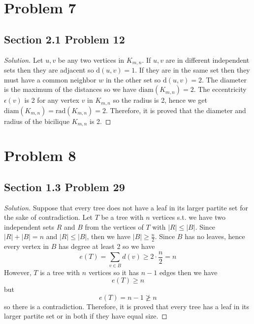 \documentclass[12pt]{article}
\newenvironment*{solution}{\begin{proof}[Solution]}{\end{proof}}
\begin{document}
\section*{Problem 7}
\subsection*{Section 2.1 Problem 12}
\begin{solution}
    Let \(u,v\) be any two vertices in \(K_{m,n}\). If \(u,v\) are in
    different independent sets then they are adjacent so \(\text{d}(u,v)=1\).
    If they are in the same set then they must have a common neighbor \(w\) in
    the other set so \(\text{d}(u,v)=2\). The diameter is the maximum of the
    distances so we have \(\text{diam}(K_{m,n})=2\). The eccentricity \(
    \epsilon(v)\) is 2 for any vertex \(v\) in \(K_{m,n}\) so the radius is 2,
    hence we get \(\text{diam}(K_{m,n})=\text{rad}(K_{m,n})=2\). Therefore, it
    is proved that the diameter and radius of the bicilique \(K_{m,n}\) is 2.
\end{solution}
\section*{Problem 8}
\subsection*{Section 1.3 Problem 29}
\begin{solution}
    Suppose that every tree does not have a leaf in its larger partite set for
    the sake of contradiction. Let \(T\) be a tree with \(n\) vertices s.t. we
    have two independent sets \(R\) and \(B\) from the vertices of \(T\) with
    \(|R|\leq|B|\). Since \(|R|+|B|=n\) and \(|R|\leq|B|\), then we have \(|B|
    \geq\frac{n}{2}\). Since \(B\) has no leaves, hence every vertex in \(B\)
    has degree at least 2 so we have \[e(T)=\sum_{v\in B}d(v)\geq2\cdot
    \frac{n}{2}=n\]However, \(T\) is a tree with \(n\) vertices so it has \(
    n-1\) edges then we have \[e(T)\geq n\] but \[e(T)=n-1\not\geq n\] so
    there is a contradiction. Therefore, it is proved that every tree has a
    leaf in its larger partite set or in both if they have equal size.
\end{solution}
\end{document}
